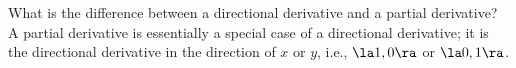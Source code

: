 {What is the difference between a directional derivative and a partial derivative?
}
{A partial derivative is essentially a special case of a directional derivative; it is the directional derivative in the direction of $x$ or $y$, i.e., $\la 1,0\ra$ or $\la 0,1\ra$.
}